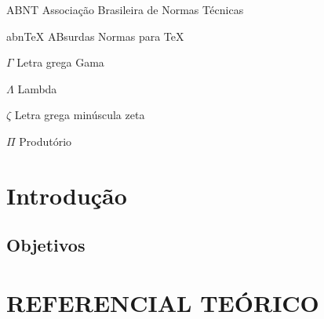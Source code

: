 \documentclass[
	12pt,				%
	openright,			%
	oneside,      %
	a4paper,			%
	english,			%
	french,				%
	spanish,			%
	brazil,				%
	]{abntex2}\usepackage[]{graphicx}\usepackage[]{xcolor}
\begin{document}
\listoffigures*
\cleardoublepage

\listoftables*
\cleardoublepage

\begin{siglas}
  \item[ABNT] Associação Brasileira de Normas Técnicas
  \item[abnTeX] ABsurdas Normas para TeX
\end{siglas}

\begin{simbolos}
  \item[$ \Gamma $] Letra grega Gama
  \item[$ \Lambda $] Lambda
  \item[$ \zeta $] Letra grega minúscula zeta
  \item[$ \Pi $] Produtório
\end{simbolos}

\tableofcontents*
\cleardoublepage

\textual

\chapter[Introdução]{Introdução}



\section{Objetivos}







\chapter{REFERENCIAL TEÓRICO}
\end{document}
